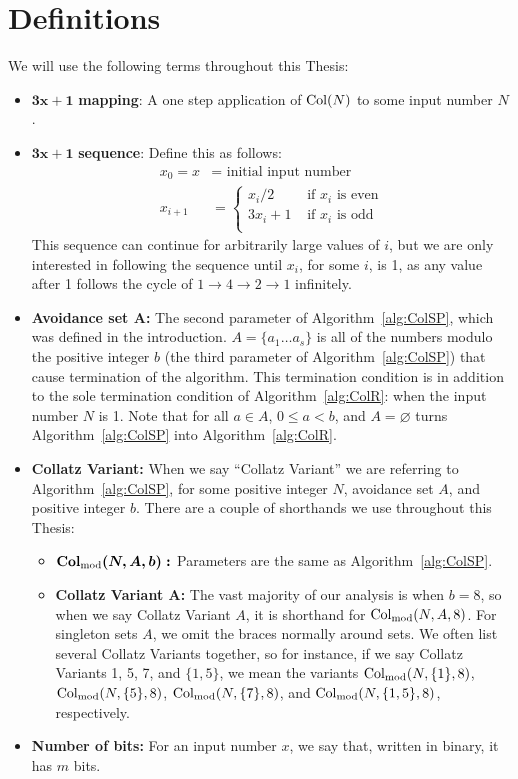 \chapter{Definitions} \label{sec:defns}
We will use the following terms throughout this Thesis:
\begin{itemize}
    \item $\boldsymbol{3x+1}$\textbf{ mapping}: A one step application of $\mathrm{Col}(N)$ to some input number $N$.
    \item $\boldsymbol{3x+1}$\textbf{ sequence}: Define this as follows: 
    \begin{align*}
        x_0 = x &= \text{ initial input number} \\
        x_{i+1} &= \begin{cases} 
        x_{i}/2 &\text{ if $x_i$ is even} \\
        3 x_{i} + 1 &\text{ if $x_i$ is odd} \\
        \end{cases}
    \end{align*}
    This sequence can continue for arbitrarily large values of $i$, but we are only interested in following the sequence until $x_i$, for some $i$, is 1, as any value after 1 follows the cycle of $1 \rightarrow 4 \rightarrow 2 \rightarrow 1$ infinitely.
    \item \textbf{Avoidance set $\boldsymbol A$:} The second parameter of Algorithm~\ref{alg:ColSP}, which was defined in the introduction. $A = \{a_1 \ldots a_s\}$ is all of the numbers modulo the positive integer $b$ (the third parameter of Algorithm~\ref{alg:ColSP}) that cause termination of the algorithm. This termination condition is in addition to the sole termination condition of Algorithm~\ref{alg:ColR}: when the input number $N$ is 1. Note that for all $a \in A$, $0 \le a < b$, and $A = \varnothing$ turns Algorithm~\ref{alg:ColSP} into Algorithm~\ref{alg:ColR}.
    \item \textbf{Collatz Variant:} When we say ``Collatz Variant'' we are referring to Algorithm~\ref{alg:ColSP}, for some positive integer $N$, avoidance set $A$, and positive integer $b$. There are a couple of shorthands we use throughout this Thesis:
      \begin{itemize}
      \item $\boldsymbol{\mathrm{Col}_{\text{mod}}(N,A,b):}$ Parameters are the same as Algorithm~\ref{alg:ColSP}.
      \item \textbf{Collatz Variant A:} The vast majority of our analysis is when $b = 8$, so when we say Collatz Variant $A$, it is shorthand for $\mathrm{Col}_{\text{mod}}(N,A,8)$. For singleton sets $A$, we omit the braces normally around sets. We often list several Collatz Variants together, so for instance, if we say Collatz Variants 1, 5, 7, and $\{1,5\}$, we mean the variants $\mathrm{Col}_{\text{mod}}(N,\{1\},8)$, $\mathrm{Col}_{\text{mod}}(N,\{5\},8)$, $\mathrm{Col}_{\text{mod}}(N,\{7\},8)$, and $\mathrm{Col}_{\text{mod}}(N,\{1,5\},8)$, respectively.
      \end{itemize}

\item \textbf{Number of bits:} For an input number $x$, we say that, written in binary, it has $m$ bits.
\end{itemize}
